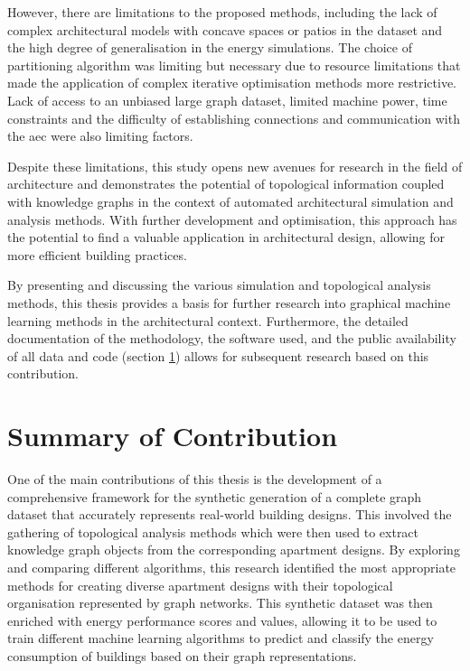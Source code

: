 \documentclass[a4paper, 12pt]{report}
\begin{document}
However, there are limitations to the proposed methods, including the lack of complex architectural models with concave spaces or patios in the dataset and the high degree of generalisation in the energy simulations. The choice of partitioning algorithm was limiting but necessary due to resource limitations that made the application of complex iterative optimisation methods more restrictive. Lack of access to an unbiased large graph dataset, limited machine power, time constraints and the difficulty of establishing connections and communication with the \acrshort{aec} were also limiting factors.

Despite these limitations, this study opens new avenues for research in the field of architecture and demonstrates the potential of topological information coupled with \glspl{knowledge graph} in the context of automated architectural simulation and analysis methods. With further development and optimisation, this approach has the potential to find a valuable application in architectural design, allowing for more efficient building practices.

By presenting and discussing the various simulation and topological analysis methods, this thesis provides a basis for further research into graphical machine learning methods in the architectural context. Furthermore, the detailed documentation of the methodology, the software used, and the public availability of all data and code (section \ref{sec:summary-of-contribution}) allows for subsequent research based on this contribution.

\section{Summary of Contribution}\label{sec:summary-of-contribution}

One of the main contributions of this thesis is the development of a comprehensive framework for the synthetic generation of a complete graph dataset that accurately represents real-world building designs. This involved the gathering of topological analysis methods which were then used to extract \gls{knowledge graph} objects from the corresponding apartment designs. By exploring and comparing different algorithms, this research identified the most appropriate methods for creating diverse apartment designs with their topological organisation represented by graph networks. This synthetic dataset was then enriched with energy performance scores and values, allowing it to be used to train different machine learning algorithms to predict and classify the energy consumption of buildings based on their graph representations.
\end{document}
